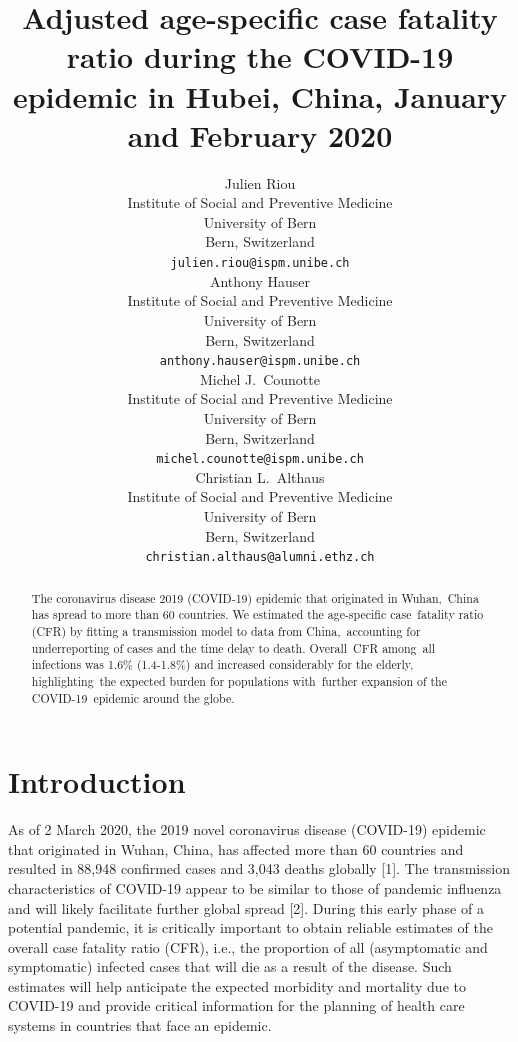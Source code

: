 \documentclass{article}
\title{Adjusted age-specific case fatality ratio during the COVID-19 epidemic in Hubei, China, January and February 2020}
\author{
   Julien Riou \\
  Institute of Social and Preventive Medicine\\
  University of Bern\\
  Bern, Switzerland \\
  \texttt{julien.riou@ispm.unibe.ch} \\
  \And
   Anthony Hauser \\
  Institute of Social and Preventive Medicine\\
  University of Bern\\
  Bern, Switzerland \\
  \texttt{anthony.hauser@ispm.unibe.ch} \\
  \And
   Michel J.~Counotte \\
  Institute of Social and Preventive Medicine\\
  University of Bern\\
  Bern, Switzerland \\
  \texttt{michel.counotte@ispm.unibe.ch} \\
  \And
Christian L.~Althaus \\
Institute of Social and Preventive Medicine\\
University of Bern\\
Bern, Switzerland \\
\texttt{christian.althaus@alumni.ethz.ch}
}
\begin{document}
\maketitle

\begin{abstract}
The coronavirus disease 2019 (COVID-19) epidemic that originated in Wuhan, China has spread to more than 60 countries. We estimated the age-specific case fatality ratio (CFR) by fitting a transmission model to data from China, accounting for underreporting of cases and the time delay to death. Overall CFR among all infections was 1.6\% (1.4-1.8\%) and increased considerably for the elderly, highlighting the expected burden for populations with further expansion of the COVID-19 epidemic around the globe.
\end{abstract}

\section*{Introduction}

As of 2 March 2020, the 2019 novel coronavirus disease (COVID-19) epidemic that originated in Wuhan, China, has affected more than 60 countries and resulted in 88,948 confirmed cases and 3,043 deaths globally [1]. The transmission characteristics of COVID-19 appear to be similar to those of pandemic influenza and will likely facilitate further global spread [2]. During this early phase of a potential pandemic, it is critically important to obtain reliable estimates of the overall case fatality ratio (CFR), i.e., the proportion of all (asymptomatic and symptomatic) infected cases that will die as a result of the disease. Such estimates will help anticipate the expected morbidity and mortality due to COVID-19 and provide critical information for the planning of health care systems in countries that face an epidemic.
\end{document}
